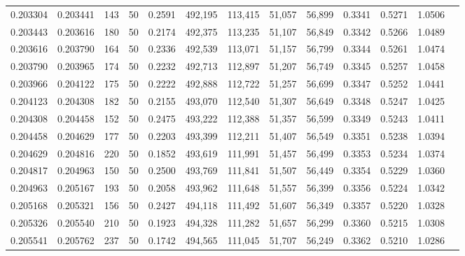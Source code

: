 \begin{tabular}{rrrrrrrrrrrrr}
0.203304 & 0.203441 &   143 &  50 &                                     0.2591 & 492,195 & 113,415 &  51,057 &  56,899 & 0.3341 & 0.5271 & 1.0506 \\
0.203443 & 0.203616 &   180 &  50 &                                     0.2174 & 492,375 & 113,235 &  51,107 &  56,849 & 0.3342 & 0.5266 & 1.0489 \\
0.203616 & 0.203790 &   164 &  50 &                                     0.2336 & 492,539 & 113,071 &  51,157 &  56,799 & 0.3344 & 0.5261 & 1.0474 \\
0.203790 & 0.203965 &   174 &  50 &                                     0.2232 & 492,713 & 112,897 &  51,207 &  56,749 & 0.3345 & 0.5257 & 1.0458 \\
0.203966 & 0.204122 &   175 &  50 &                                     0.2222 & 492,888 & 112,722 &  51,257 &  56,699 & 0.3347 & 0.5252 & 1.0441 \\
0.204123 & 0.204308 &   182 &  50 &                                     0.2155 & 493,070 & 112,540 &  51,307 &  56,649 & 0.3348 & 0.5247 & 1.0425 \\
0.204308 & 0.204458 &   152 &  50 &                                     0.2475 & 493,222 & 112,388 &  51,357 &  56,599 & 0.3349 & 0.5243 & 1.0411 \\
0.204458 & 0.204629 &   177 &  50 &                                     0.2203 & 493,399 & 112,211 &  51,407 &  56,549 & 0.3351 & 0.5238 & 1.0394 \\
0.204629 & 0.204816 &   220 &  50 &                                     0.1852 & 493,619 & 111,991 &  51,457 &  56,499 & 0.3353 & 0.5234 & 1.0374 \\
0.204817 & 0.204963 &   150 &  50 &                                     0.2500 & 493,769 & 111,841 &  51,507 &  56,449 & 0.3354 & 0.5229 & 1.0360 \\
0.204963 & 0.205167 &   193 &  50 &                                     0.2058 & 493,962 & 111,648 &  51,557 &  56,399 & 0.3356 & 0.5224 & 1.0342 \\
0.205168 & 0.205321 &   156 &  50 &                                     0.2427 & 494,118 & 111,492 &  51,607 &  56,349 & 0.3357 & 0.5220 & 1.0328 \\
0.205326 & 0.205540 &   210 &  50 &                                     0.1923 & 494,328 & 111,282 &  51,657 &  56,299 & 0.3360 & 0.5215 & 1.0308 \\
0.205541 & 0.205762 &   237 &  50 &                                     0.1742 & 494,565 & 111,045 &  51,707 &  56,249 & 0.3362 & 0.5210 & 1.0286 \\

\end{tabular}
